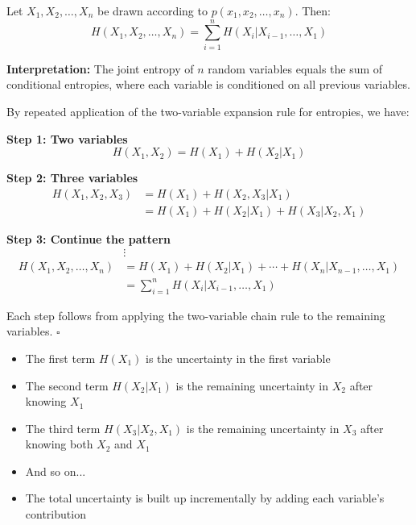 \documentclass[11pt,a4paper]{book}
\newenvironment{formulabox}[1][Formula]{
    \begin{tcolorbox}[
        enhanced,
        breakable,
        colback=softcoral!10,
        colframe=softcoral!200,
        title=#1,
        fonttitle=\bfseries,
        coltitle=white,
        sharp corners,
        boxrule=1pt,
        left=8pt,
        right=8pt,
        top=6pt,
        bottom=6pt
    ]
}{
    \end{tcolorbox}
}
\newenvironment{infobox}[1][For more understanding]{
    \begin{tcolorbox}[
        enhanced,
        breakable,
        colback=mintgreen!10,
        colframe=mintgreen!200,
        title=#1,
        fonttitle=\bfseries,
        sharp corners,
        boxrule=0.8pt,
        left=8pt,
        right=8pt,
        top=6pt,
        bottom=6pt
    ]
}{
    \end{tcolorbox}
}
\newenvironment{derivationbox}[1][Derivation]{
    \begin{tcolorbox}[
        enhanced,
        breakable,
        colback=softpeach!10,
        colframe=softpeach!200,
        title=#1,
        fonttitle=\bfseries,
        sharp corners,
        boxrule=0.8pt,
        left=10pt,
        right=10pt,
        top=8pt,
        bottom=8pt
    ]
}{
    \end{tcolorbox}
}
\begin{document}
\begin{formulabox}[Theorem 2.5.1: Chain Rule for Entropy]
    Let \(X_1, X_2, \ldots, X_n\) be drawn according to \(p(x_1, x_2, \ldots, x_n)\). Then:
    \[
    H(X_1, X_2, \ldots, X_n) = \sum_{i=1}^{n} H(X_i | X_{i-1}, \ldots, X_1)
    \]
    
    \textbf{Interpretation:} The joint entropy of \(n\) random variables equals the sum of conditional entropies, where each variable is conditioned on all previous variables.
\end{formulabox}

\begin{derivationbox}[Proof of Chain Rule for Entropy]
    By repeated application of the two-variable expansion rule for entropies, we have:
    
    \textbf{Step 1: Two variables}
    \begin{equation}
    H(X_1, X_2) = H(X_1) + H(X_2|X_1) \tag{2.49}
    \end{equation}
    
    \textbf{Step 2: Three variables}
    \begin{align}
    H(X_1, X_2, X_3) &= H(X_1) + H(X_2, X_3|X_1) \tag{2.50}\\
    &= H(X_1) + H(X_2|X_1) + H(X_3|X_2, X_1) \tag{2.51}
    \end{align}
    
    \textbf{Step 3: Continue the pattern}
    \begin{align*}
    &\vdots \\
    H(X_1, X_2, \ldots, X_n) &= H(X_1) + H(X_2|X_1) + \cdots + H(X_n|X_{n-1}, \ldots, X_1) \tag{2.52}\\
    &= \sum_{i=1}^{n} H(X_i | X_{i-1}, \ldots, X_1) \tag{2.53}
    \end{align*}
    
    Each step follows from applying the two-variable chain rule to the remaining variables. \(\square\)
\end{derivationbox}

\begin{infobox}[Understanding the Chain Rule]
    \begin{itemize}
        \item The first term \(H(X_1)\) is the uncertainty in the first variable
        \item The second term \(H(X_2|X_1)\) is the remaining uncertainty in \(X_2\) after knowing \(X_1\)
        \item The third term \(H(X_3|X_2, X_1)\) is the remaining uncertainty in \(X_3\) after knowing both \(X_2\) and \(X_1\)
        \item And so on...
        \item The total uncertainty is built up incrementally by adding each variable's contribution
    \end{itemize}
\end{infobox}
\end{document}
